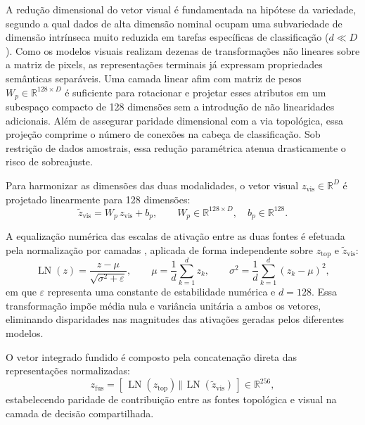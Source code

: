 A redução dimensional do vetor visual é fundamentada na hipótese da variedade, segundo a qual dados de alta dimensão nominal ocupam uma subvariedade de dimensão intrínseca muito reduzida em tarefas específicas de classificação ($d \ll D$). Como os modelos visuais realizam dezenas de transformações não lineares sobre a matriz de pixels, as representações terminais já expressam propriedades semânticas separáveis. Uma camada linear afim com matriz de pesos $W_p \in \mathbb{R}^{128 \times D}$ é suficiente para rotacionar e projetar esses atributos em um subespaço compacto de 128 dimensões sem a introdução de não linearidades adicionais. Além de assegurar paridade dimensional com a via topológica, essa projeção comprime o número de conexões na cabeça de classificação. Sob restrição de dados amostrais, essa redução paramétrica atenua drasticamente o risco de sobreajuste.

Para harmonizar as dimensões das duas modalidades, o vetor visual $z_{\mathrm{vis}} \in \mathbb{R}^D$ é projetado linearmente para 128 dimensões:
\begin{equation}
\tilde{z}_{\mathrm{vis}} = W_p \, z_{\mathrm{vis}} + b_p, \qquad W_p \in \mathbb{R}^{128 \times D}, \quad b_p \in \mathbb{R}^{128}.
\label{eq:fusao-projecao}
\end{equation}

A equalização numérica das escalas de ativação entre as duas fontes é efetuada pela normalização por camadas \cite{ba2016layer}, aplicada de forma independente sobre $z_{\mathrm{top}}$ e $\tilde{z}_{\mathrm{vis}}$:
\begin{equation}
\operatorname{LN}(z) = \frac{z - \mu}{\sqrt{\sigma^2 + \varepsilon}}, \qquad \mu = \frac{1}{d}\sum_{k=1}^{d} z_k, \qquad \sigma^2 = \frac{1}{d}\sum_{k=1}^{d} (z_k - \mu)^2,
\label{eq:ln}
\end{equation}
em que $\varepsilon$ representa uma constante de estabilidade numérica e $d = 128$. Essa transformação impõe média nula e variância unitária a ambos os vetores, eliminando disparidades nas magnitudes das ativações geradas pelos diferentes modelos.

O vetor integrado fundido é composto pela concatenação direta das representações normalizadas:
\begin{equation}
z_{\mathrm{fus}} = \left[\, \operatorname{LN}(z_{\mathrm{top}}) \,\Vert\, \operatorname{LN}(\tilde{z}_{\mathrm{vis}}) \,\right] \in \mathbb{R}^{256},
\label{eq:fusao-concat}
\end{equation}
estabelecendo paridade de contribuição entre as fontes topológica e visual na camada de decisão compartilhada.

